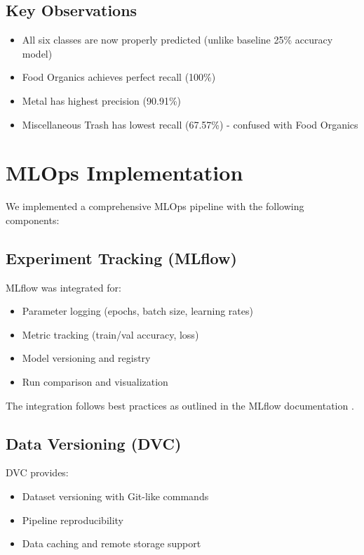 \documentclass[conference]{IEEEtran}
\begin{document}
\subsection{Key Observations}
\begin{itemize}
    \item All six classes are now properly predicted (unlike baseline 25\% accuracy model)
    \item Food Organics achieves perfect recall (100\%)
    \item Metal has highest precision (90.91\%)
    \item Miscellaneous Trash has lowest recall (67.57\%) - confused with Food Organics
\end{itemize}

\section{MLOps Implementation}

We implemented a comprehensive MLOps pipeline with the following components:

\subsection{Experiment Tracking (MLflow)}
MLflow was integrated for:
\begin{itemize}
    \item Parameter logging (epochs, batch size, learning rates)
    \item Metric tracking (train/val accuracy, loss)
    \item Model versioning and registry
    \item Run comparison and visualization
\end{itemize}

The integration follows best practices as outlined in the MLflow documentation \cite{mlflow2024}.

\subsection{Data Versioning (DVC)}
DVC provides:
\begin{itemize}
    \item Dataset versioning with Git-like commands
    \item Pipeline reproducibility
    \item Data caching and remote storage support
\end{itemize}
\end{document}
